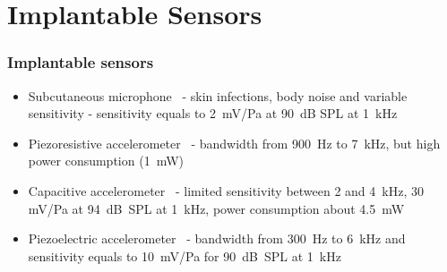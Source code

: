 \documentclass[dvipsnames,12pt]{beamer}
\begin{document}
\section{Implantable Sensors}
\begin{frame}
\frametitle{Implantable sensors}
\begin{itemize}
    \item Subcutaneous microphone~\cite{jenkins2007, pulcherio2014} - skin infections, body noise and variable sensitivity - sensitivity equals to 2~mV/Pa at 90~dB SPL at 1~kHz~\cite{zenner2001} \pause
    \item Piezoresistive accelerometer~\cite{park2007} - bandwidth from 900~Hz to 7~kHz, but high power consumption (1~mW) \pause
    \item Capacitive accelerometer~\cite{ko2009,zurcher2007} - limited sensitivity between 2 and 4~kHz, 30 mV/Pa at 94~dB~SPL at 1~kHz, power consumption about 4.5~mW \pause
    \item Piezoelectric accelerometer~\cite{yip2015,beker2013} -  bandwidth from 300~Hz to  6~kHz and sensitivity equals to 10~mV/Pa for 90~dB~SPL at 1~kHz
\end{itemize}
\end{frame}
\end{document}
